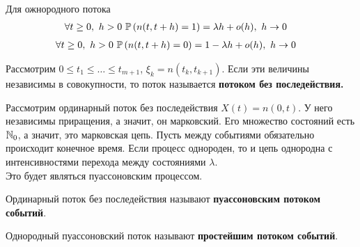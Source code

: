 \begin{Prop}
    Для ожнородного потока
    \begin{align*}
      & \forall t \geq 0, \ h > 0 \ \mathbb{P}\left( n(t,t+h) = 1 \right) = \lambda h+o(h), \ h \to 0
    \end{align*}
    \begin{align*}
      & \forall t \geq 0, \ h > 0 \ \mathbb{P}\left( n(t,t+h) = 0 \right) = 1 - \lambda h+o(h), \ h \to 0
    \end{align*}
\end{Prop}
\begin{Def}
    Рассмотрим $0 \leq t_1 \leq \dots \leq t_{m+1}$, $\xi_k = n(t_k,t_{k+1})$.
    Если эти величины независимы в совокупности, то поток называется
    \textbf{потоком без последействия.}
\end{Def}
\begin{Prop}
    Рассмотрим ординарный поток без последействия $X(t) = n(0,t)$. У него
    независимы приращения, а значит, он марковский. Его множество состояний есть
    $\mathbb{N}_0$, а значит, это марковская цепь. Пусть между событиями обязательно
    происходит конечное время. Если процесс однороден, то и цепь однородна с
    интенсивностями перехода между состояниями $\lambda$.
    \\
    Это будет являться пуассоновским процессом.
\end{Prop}
\begin{Def}
    Ординарный поток без последействия называют \textbf{пуассоновским потоком
      событий}.
\end{Def}
\begin{Def}
    Однородный пуассоновский поток называют \textbf{простейшим потоком событий}.
\end{Def}
